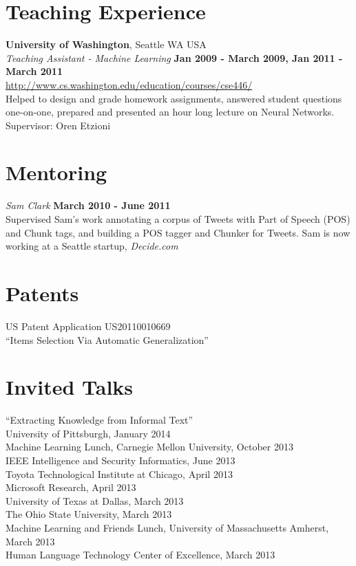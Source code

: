 \documentclass[margin,line]{res}
\begin{document}
\begin{resume}
\section{\sc Teaching Experience}

{\bf University of Washington}, Seattle WA USA\\
{\em Teaching Assistant - Machine Learning} \hfill {\bf Jan 2009 - March 2009, Jan 2011 - March 2011} \\
\url{http://www.cs.washington.edu/education/courses/cse446/} \\
Helped to design and grade homework assignments, answered student questions one-on-one, prepared and presented an hour long
lecture on Neural Networks. \\
Supervisor: Oren Etzioni

\section{\sc Mentoring}

{\em Sam Clark} \hfill {\bf March 2010 - June 2011} \\
Supervised Sam's work annotating a corpus of Tweets with Part of Speech (POS) and Chunk tags, and building a POS tagger and Chunker
for Tweets.  Sam is now working at a Seattle startup, {\em Decide.com}

\section{\sc Patents}
US Patent Application US20110010669 \\
``Items Selection Via Automatic Generalization''

\section{\sc Invited Talks}
``Extracting Knowledge from Informal Text'' \\
University of Pittsburgh, January 2014 \\
Machine Learning Lunch, Carnegie Mellon University, October 2013 \\
IEEE Intelligence and Security Informatics, June 2013 \\
Toyota Technological Institute at Chicago, April 2013 \\
Microsoft Research, April 2013 \\
University of Texas at Dallas, March 2013 \\
The Ohio State University, March 2013 \\
Machine Learning and Friends Lunch, University of Massachusetts Amherst, March 2013 \\
Human Language Technology Center of Excellence, March 2013 \\


\end{resume}
\end{document}

